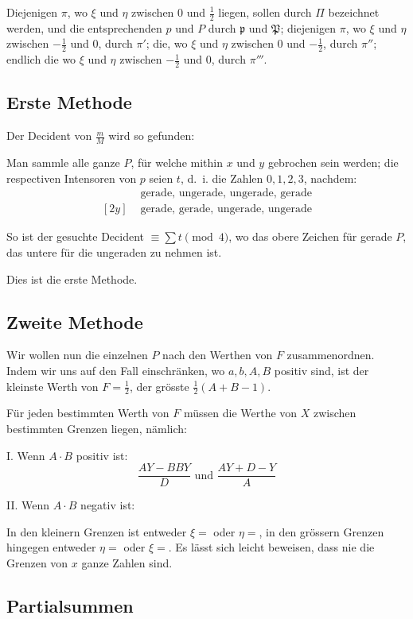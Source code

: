 \documentclass[12pt,a4paper]{article}
\begin{document}
Diejenigen $\pi$, wo $\xi$ und $\eta$ zwischen $0$ und $\frac{1}{2}$ liegen, sollen durch $\Pi$ bezeichnet werden, und die entsprechenden $p$ und $P$ durch $\mathfrak{p}$ und $\mathfrak{P}$; diejenigen $\pi$, wo $\xi$ und $\eta$ zwischen $-\frac{1}{2}$ und $0$, durch $\pi'$; die, wo $\xi$ und $\eta$ zwischen $0$ und $-\frac{1}{2}$, durch $\pi''$; endlich die wo $\xi$ und $\eta$ zwischen $-\frac{1}{2}$ und $0$, durch $\pi'''$.

\subsection*{Erste Methode}

Der Decident von $\frac{m}{M}$ wird so gefunden:

Man sammle alle ganze $P$, für welche mithin $x$ und $y$ gebrochen sein werden; die respectiven Intensoren von $p$ seien $t$, d.~i. die Zahlen $0, 1, 2, 3$, nachdem:
\begin{align*}
[2x] &\text{ gerade, ungerade, ungerade, gerade}\\
[2y] &\text{ gerade, gerade, ungerade, ungerade}
\end{align*}

So ist der gesuchte Decident $\equiv \sum t \pmod{4}$, wo das obere Zeichen für gerade $P$, das untere für die ungeraden zu nehmen ist.

Dies ist die erste Methode.

\subsection*{Zweite Methode}

Wir wollen nun die einzelnen $P$ nach den Werthen von $F$ zusammenordnen. Indem wir uns auf den Fall einschränken, wo $a, b, A, B$ positiv sind, ist der kleinste Werth von $F = \frac{1}{2}$, der grösste $\frac{1}{2}(A+B-1)$.

Für jeden bestimmten Werth von $F$ müssen die Werthe von $X$ zwischen bestimmten Grenzen liegen, nämlich:

I. Wenn $A \cdot B$ positiv ist:
\[
\frac{AY - BBY}{D} \text{ und } \frac{AY + D - Y}{A}
\]

II. Wenn $A \cdot B$ negativ ist:

In den kleinern Grenzen ist entweder $\xi = $ oder $\eta = $, in den grössern Grenzen hingegen entweder $\eta = $ oder $\xi = $. Es lässt sich leicht beweisen, dass nie die Grenzen von $x$ ganze Zahlen sind.

\subsection*{Partialsummen}
\end{document}
